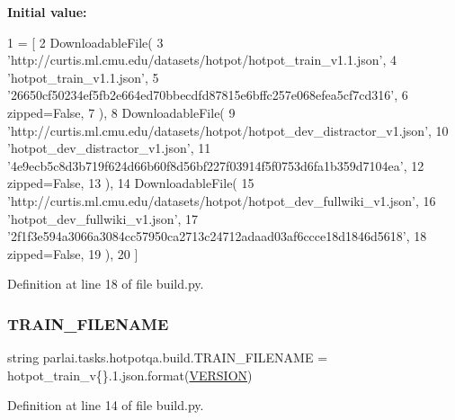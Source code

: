 {\bfseries Initial value\+:}
\begin{DoxyCode}
1 =  [
2     DownloadableFile(
3         \textcolor{stringliteral}{'http://curtis.ml.cmu.edu/datasets/hotpot/hotpot\_train\_v1.1.json'},
4         \textcolor{stringliteral}{'hotpot\_train\_v1.1.json'},
5         \textcolor{stringliteral}{'26650cf50234ef5fb2e664ed70bbecdfd87815e6bffc257e068efea5cf7cd316'},
6         zipped=\textcolor{keyword}{False},
7     ),
8     DownloadableFile(
9         \textcolor{stringliteral}{'http://curtis.ml.cmu.edu/datasets/hotpot/hotpot\_dev\_distractor\_v1.json'},
10         \textcolor{stringliteral}{'hotpot\_dev\_distractor\_v1.json'},
11         \textcolor{stringliteral}{'4e9ecb5c8d3b719f624d66b60f8d56bf227f03914f5f0753d6fa1b359d7104ea'},
12         zipped=\textcolor{keyword}{False},
13     ),
14     DownloadableFile(
15         \textcolor{stringliteral}{'http://curtis.ml.cmu.edu/datasets/hotpot/hotpot\_dev\_fullwiki\_v1.json'},
16         \textcolor{stringliteral}{'hotpot\_dev\_fullwiki\_v1.json'},
17         \textcolor{stringliteral}{'2f1f3e594a3066a3084cc57950ca2713c24712adaad03af6ccce18d1846d5618'},
18         zipped=\textcolor{keyword}{False},
19     ),
20 ]
\end{DoxyCode}


Definition at line 18 of file build.\+py.

\mbox{\label{namespaceparlai_1_1tasks_1_1hotpotqa_1_1build_a8987e1381df8f7e74c98455c4af7d1e8}} 
\subsubsection{\texorpdfstring{T\+R\+A\+I\+N\+\_\+\+F\+I\+L\+E\+N\+A\+ME}{TRAIN\_FILENAME}}
{\footnotesize\ttfamily string parlai.\+tasks.\+hotpotqa.\+build.\+T\+R\+A\+I\+N\+\_\+\+F\+I\+L\+E\+N\+A\+ME = \textquotesingle{}hotpot\+\_\+train\+\_\+v\{\}.\+1.json\textquotesingle{}.format(\hyperlink{namespaceparlai_1_1tasks_1_1hotpotqa_1_1build_a57a5627d2111821eb32c42f113773b1a}{V\+E\+R\+S\+I\+ON})}



Definition at line 14 of file build.\+py.

